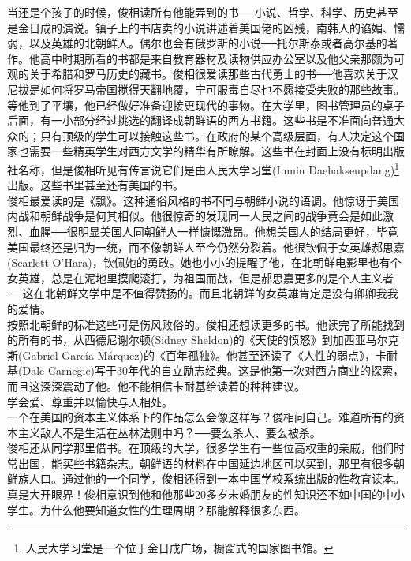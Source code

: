 当还是个孩子的时候，俊相读所有他能弄到的书──小说、哲学、科学、历史甚至是金日成的演说。镇子上的书店卖的小说讲述着美国佬的凶残，南韩人的谄媚、懦弱，以及英雄的北朝鲜人。偶尔也会有俄罗斯的小说──托尔斯泰或者高尔基的著作。他高中时期所看的书都是来自教育器材及读物供应办公室以及他父亲那颇为可观的关于希腊和罗马历史的藏书。俊相很爱读那些古代勇士的书──他喜欢关于汉尼拔是如何将罗马帝国搅得天翻地覆，宁可服毒自尽也不愿接受失败的那些故事。\\

等他到了平壤，他已经做好准备迎接更现代的事物。在大学里，图书管理员的桌子后面，有一小部分经过挑选的翻译成朝鲜语的西方书籍。这些书是不准面向普通大众的；只有顶级的学生可以接触这些书。在政府的某个高级层面，有人决定这个国家也需要一些精英学生对西方文学的精华有所瞭解。这些书在封面上没有标明出版社名称，但是俊相听见有传言说它们是由人民大学习堂(Inmin Daehakseupdang)\footnote{人民大学习堂是一个位于金日成广场，橱窗式的国家图书馆。}出版。这些书里甚至还有美国的书。\\

俊相最爱读的是《飘》。这种通俗风格的书不同与朝鲜小说的语调。他惊讶于美国内战和朝鲜战争是何其相似。他很惊奇的发现同一人民之间的战争竟会是如此激烈、血腥──很明显美国人同朝鲜人一样慷慨激昂。他想美国人的结局更好，毕竟美国最终还是归为一统，而不像朝鲜人至今仍然分裂着。他很钦佩于女英雄郝思嘉(Scarlett O'Hara)，钦佩她的勇敢。她也小小的提醒了他，在北朝鲜电影里也有个女英雄，总是在泥地里摸爬滚打，为祖国而战，但是郝思嘉更多的是个人主义者──这在北朝鲜文学中是不值得赞扬的。而且北朝鲜的女英雄肯定是没有卿卿我我的爱情。\\

按照北朝鲜的标准这些可是伤风败俗的。俊相还想读更多的书。他读完了所能找到的所有的书，从西德尼谢尔顿(Sidney Sheldon)的《天使的愤怒》到加西亚马尔克斯(Gabriel García Márquez)的《百年孤独》。他甚至还读了《人性的弱点》，卡耐基(Dale Carnegie)写于30年代的自立励志经典。这是他第一次对西方商业的探索，而且这深深震动了他。他不能相信卡耐基给读着的种种建议。\\

学会爱、尊重并以愉快与人相处。\\

一个在美国的资本主义体系下的作品怎么会像这样写？俊相问自己。难道所有的资本主义敌人不是生活在丛林法则中吗？──要么杀人、要么被杀。\\

俊相还从同学那里借书。在顶级的大学，很多学生有一些位高权重的亲戚，他们时常出国，能买些书籍杂志。朝鲜语的材料在中国延边地区可以买到，那里有很多朝鲜族人口。通过他的一个同学，俊相还得到一本中国学校系统出版的性教育读本。真是大开眼界！俊相意识到他和他那些20多岁未婚朋友的性知识还不如中国的中小学生。为什么他要知道女性的生理周期？那能解释很多东西。\\

